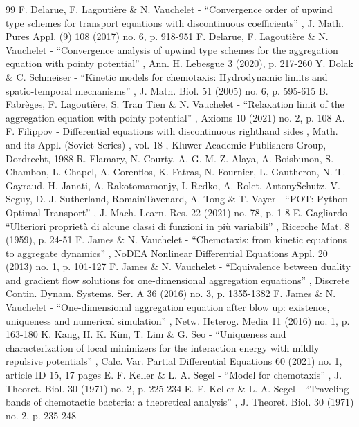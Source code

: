 \documentclass[11pt]{article}
\numberwithin{equation}{section}
\theoremstyle{plain}
\theoremstyle{definition}
\begin{document}
\begin{thebibliography}{99}
 F. Delarue, F. Lagoutière \& N. Vauchelet - “Convergence order of upwind type schemes for transport equations with discontinuous coefficients” , J. Math. Pures Appl. (9) 108 (2017) no. 6, p. 918-951
 F. Delarue, F. Lagoutière \& N. Vauchelet - “Convergence analysis of upwind type schemes for the aggregation equation with pointy potential” , Ann. H. Lebesgue 3 (2020), p. 217-260
 Y. Dolak \& C. Schmeiser - “Kinetic models for chemotaxis: Hydrodynamic limits and spatio-temporal mechanisms” , J. Math. Biol. 51 (2005) no. 6, p. 595-615
 B. Fabrèges, F. Lagoutière, S. Tran Tien \& N. Vauchelet - “Relaxation limit of the aggregation equation with pointy potential” , Axioms 10 (2021) no. 2, p. 108
 A. F. Filippov - Differential equations with discontinuous righthand sides , Math. and its Appl. (Soviet Series) , vol. 18 , Kluwer Academic Publishers Group, Dordrecht, 1988
 R. Flamary, N. Courty, A. G. M. Z. Alaya, A. Boisbunon, S. Chambon, L. Chapel, A. Corenflos, K. Fatras, N. Fournier, L. Gautheron, N. T. Gayraud, H. Janati, A. Rakotomamonjy, I. Redko, A. Rolet, AntonySchutz, V. Seguy, D. J. Sutherland, RomainTavenard, A. Tong \& T. Vayer - “POT: Python Optimal Transport” , J. Mach. Learn. Res. 22 (2021) no. 78, p. 1-8
 E. Gagliardo - “Ulteriori proprietà di alcune classi di funzioni in più variabili” , Ricerche Mat. 8 (1959), p. 24-51
 F. James \& N. Vauchelet - “Chemotaxis: from kinetic equations to aggregate dynamics” , NoDEA Nonlinear Differential Equations Appl. 20 (2013) no. 1, p. 101-127
 F. James \& N. Vauchelet - “Equivalence between duality and gradient flow solutions for one-dimensional aggregation equations” , Discrete Contin. Dynam. Systems. Ser. A 36 (2016) no. 3, p. 1355-1382
 F. James \& N. Vauchelet - “One-dimensional aggregation equation after blow up: existence, uniqueness and numerical simulation” , Netw. Heterog. Media 11 (2016) no. 1, p. 163-180
 K. Kang, H. K. Kim, T. Lim \& G. Seo - “Uniqueness and characterization of local minimizers for the interaction energy with mildly repulsive potentials” , Calc. Var. Partial Differential Equations 60 (2021) no. 1, article ID 15, 17 pages
 E. F. Keller \& L. A. Segel - “Model for chemotaxis” , J. Theoret. Biol. 30 (1971) no. 2, p. 225-234
 E. F. Keller \& L. A. Segel - “Traveling bands of chemotactic bacteria: a theoretical analysis” , J. Theoret. Biol. 30 (1971) no. 2, p. 235-248

\end{thebibliography}
\end{document}
